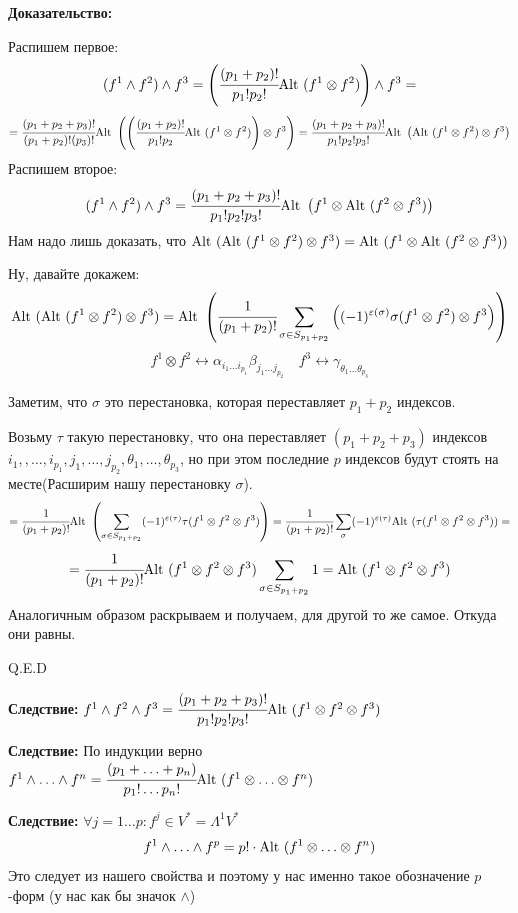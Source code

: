 \begin{enumerate}
    \textbf{Доказательство:}

    Распишем первое:
    $$(f^1 \wedge f^2)\wedge f^3 = \left(\cfrac{(p_1+p_2)!}{p_1! p_2!}\text{Alt } (f^1 \otimes f^2)\right)\wedge f^3 =$$  $$=\cfrac{(p_1 + p_2 + p_3)!}{(p_1+p_2)!(p_3)!} \text{Alt }\left(\left(\cfrac{(p_1+p_2)!}{p_1! p_2} \text{Alt } (f^1 \otimes f^2)\right)\otimes f^3 \right) = \cfrac{(p_1+p_2+p_3)!}{p_1!p_2!p_3!} \text{Alt } \left( \text{Alt }(f^1 \otimes f^2) \otimes f^3 \right)$$
    Распишем второе:
    $$(f^1 \wedge f^2)\wedge f^3 = \cfrac{(p_1+p_2+p_3)!}{p_1!p_2!p_3!} \text{Alt } \left( f^1 \otimes \text{Alt }(f^2 \otimes f^3) \right)$$
    Нам надо лишь доказать, что $\text{Alt }(\text{Alt }(f^1 \otimes f^2)\otimes f^3) = \text{Alt } (f^1 \otimes \text{Alt } (f^2 \otimes f^3))$

    Ну, давайте докажем:
    $$\text{Alt }(\text{Alt }(f^1 \otimes f^2)\otimes f^3) = \text{Alt } \left(\cfrac{1}{(p_1+p_2)!} \sum\limits_{\sigma \in S_{p_1+p_2}}\left((-1)^{\varepsilon(\sigma)}\sigma(f^1\otimes f^2)\otimes f^3\right)\right) $$
    $$f^1 \otimes f^2 \leftrightarrow \alpha_{i_1\ldots i_{p_1}}\beta_{j_1\ldots j_{p_2}} \quad f^3 \leftrightarrow \gamma_{\theta_1\ldots \theta_{p_3}}$$
    
    Заметим, что $\sigma $ это перестановка, которая переставляет $p_1 + p_2$ индексов.

    Возьму $\tau$ такую перестановку, что она переставляет $(p_1+p_2+p_3)$ индексов $i_1,,\ldots, i_{p_1},j_1,\ldots, j_{p_2},\theta_1,\ldots,\theta_{p_3}$, но при этом последние $p$ индексов будут стоять на месте(Расширим нашу перестановку $\sigma$).
    $$= \cfrac{1}{(p_1+p_2)!}\text{Alt }\left(\sum_{\sigma \in S_{p_1+p_2}}(-1)^{\varepsilon(\tau)}\tau(f^1 \otimes f^2 \otimes f^3)\right) = \cfrac{1}{(p_1+p_2)!}\sum\limits_{\sigma} (-1)^{\varepsilon(\tau)}\text{Alt }(\tau(f^1 \otimes f^2 \otimes f^3)) =$$$$= \cfrac{1}{(p_1+p_2)!}\text{Alt } (f^1 \otimes f^2 \otimes f^3)\sum\limits_{\sigma \in S_{p_1+p_2}}1 = \text{Alt } (f^1 \otimes f^2 \otimes f^3)$$
    Аналогичным образом раскрываем и получаем, для другой то же самое. Откуда они равны.


    \hfill Q.E.D

    \textbf{Следствие:} $f^1 \wedge f^2 \wedge f^3 = \cfrac{(p_1 + p_2 + p_3)!}{p_1!p_2!p_3!}\text{Alt } (f^1 \otimes f^2 \otimes f^3)$

    \textbf{Следствие:} По индукции верно $f^1 \wedge \ldots \wedge f^n = \cfrac{(p_1 +\ldots +  p_n)}{p_1!\ldots p_n!} \text{Alt } (f^1 \otimes \ldots \otimes f^n)$

    \textbf{Следствие:} $\forall j = 1 \ldots p: f^j\in V^* = \Lambda^1 V^*$
    $$f^1\wedge \ldots \wedge f^p = p!\cdot \text{Alt }(f^1 \otimes \ldots \otimes f^n)$$
    Это следует из нашего свойства и поэтому у нас именно такое обозначение $p$-форм (у нас как бы значок $\wedge$)


\end{enumerate}
